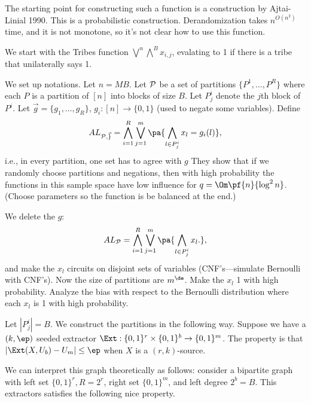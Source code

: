 The starting point for constructing such a function is a construction by Ajtai-Linial 1990. This is a probabilistic construction. Derandomization takes $n^{O(n^2)}$ time, and it is not monotone, so it's not clear how to use this function.

We start with the Tribes function $\bigvee^n\bigwedge^B x_{i,j}$, evalating to 1 if there is a tribe that unilaterally says 1. 

We set up notations. Let $n=MB$. Let $\cal P$ be a set of partitions $\{P^1,\ldots, P^R\}$ where each $P$ is a partition of $[n]$ into blocks of size $B$. 
Let $P^i_j$ denote the $j$th block of $P^i$. 
Let $\vec g = \{g_1,\ldots, g_R\}$, $g_i:[n]\to \{0,1\}$ (used to negate some variables).
Define
\[
AL_{\cal P,\vec g} = \bigwedge_{i=1}^R \bigvee_{j=1}^m \pa{
\bigwedge_{l\in P_j^i} x_l = g_i(l)
},
\]
i.e., in every partition, one set has to agree with $g$
They show that if we randomly choose partitions and negations, then with high probability the functions in this sample space have low influence for $q=\Om\pf{n}{\log^2 n}$. (Choose parameters  so the function is be balanced at the end.)

We delete the $g$: 
\[
AL_{\cal P} = \bigwedge_{i=1}^R \bigvee_{j=1}^m \pa{
\bigwedge_{l\in P_j^i} x_l.
},
\]
and make the $x_l$ circuits on disjoint sets of variables (CNF's---simulate Bernoulli with CNF's). Now the size of partitions are $m^\de$. Make the $x_l$ 1 with high probability. Analyze the bias with respect to the Bernoulli distribution where each $x_l$ is 1 with high probability.

Let $|P_j^i|=B$.
We construct the partitions in the following way. %
Suppose we have a $(k,\ep)$ seeded extractor $\Ext:\{0,1\}^r \times \{0,1\}^b\to \{0,1\}^m$. The property is that $|\Ext(X,U_b)-U_m|\le \ep$ when $X$ is a $(r,k)$-source.

We can interpret this graph theoretically as follows: consider a bipartite graph with left set $\{0,1\}^r,R=2^r$, right set $\{0,1\}^m$, and left degree $2^b=B$.  This extractors satisfies the following nice property.

